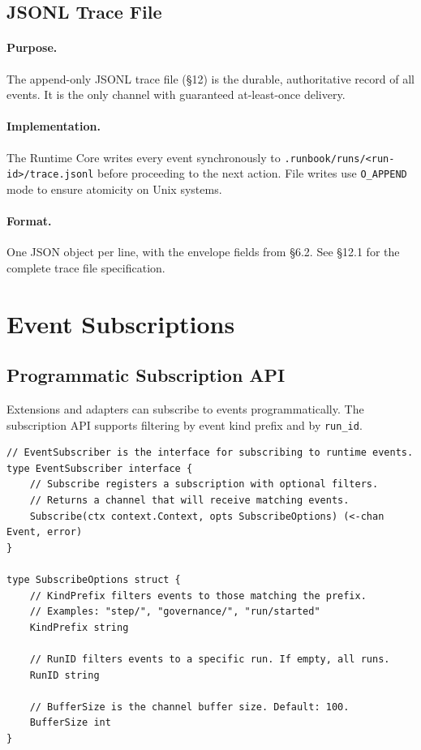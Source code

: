 
\subsection{JSONL Trace File}

\paragraph{Purpose.} The append-only JSONL trace file (§12) is the durable, authoritative record of all events. It is the only channel with guaranteed at-least-once delivery.

\paragraph{Implementation.} The Runtime Core writes every event synchronously to \texttt{.runbook/runs/<run-id>/trace.jsonl} before proceeding to the next action. File writes use \texttt{O\_APPEND} mode to ensure atomicity on Unix systems.

\paragraph{Format.} One JSON object per line, with the envelope fields from §6.2. See §12.1 for the complete trace file specification.

\section{Event Subscriptions}

\subsection{Programmatic Subscription API}

Extensions and adapters can subscribe to events programmatically. The subscription API supports filtering by event kind prefix and by \texttt{run\_id}.

\begin{verbatim}
// EventSubscriber is the interface for subscribing to runtime events.
type EventSubscriber interface {
    // Subscribe registers a subscription with optional filters.
    // Returns a channel that will receive matching events.
    Subscribe(ctx context.Context, opts SubscribeOptions) (<-chan Event, error)
}

type SubscribeOptions struct {
    // KindPrefix filters events to those matching the prefix.
    // Examples: "step/", "governance/", "run/started"
    KindPrefix string

    // RunID filters events to a specific run. If empty, all runs.
    RunID string

    // BufferSize is the channel buffer size. Default: 100.
    BufferSize int
}
\end{verbatim}

